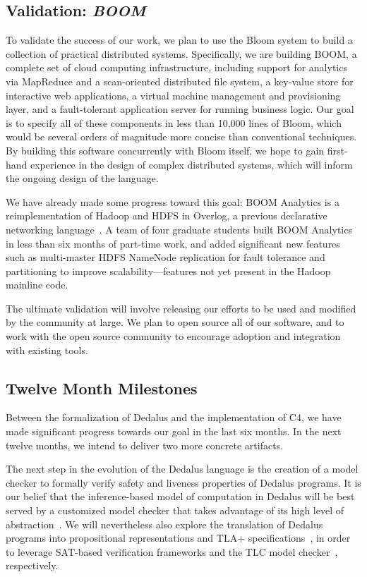 \subsection{Validation: \emph{BOOM}}
To validate the success of our work, we plan to use the Bloom system
to build a collection of practical distributed systems. Specifically,
we are building BOOM, a complete set of cloud computing
infrastructure, including support for analytics via MapReduce and a
scan-oriented distributed file system, a key-value store for
interactive web applications, a virtual machine management and
provisioning layer, and a fault-tolerant application server for
running business logic. Our goal is to specify all of these components
in less than 10,000 lines of Bloom, which would be several orders of
magnitude more concise than conventional techniques. By building this
software concurrently with Bloom itself, we hope to gain first-hand
experience in the design of complex distributed systems, which will
inform the ongoing design of the language.

We have already made some progress toward this goal: BOOM Analytics is
a reimplementation of Hadoop and HDFS in Overlog, a previous
declarative networking language~\cite{boom-eurosys}. A team of four
graduate students built BOOM Analytics in less than six months of
part-time work, and added significant new features such as
multi-master HDFS NameNode replication for fault tolerance and
partitioning to improve scalability---features not yet present in the
Hadoop mainline code.


The ultimate validation will involve releasing our efforts to be used
and modified by the community at large. We plan to open source all of
our software, and to work with the open source community to encourage
adoption and integration with existing tools.

\subsection{Twelve Month Milestones}

Between the formalization of Dedalus and the implementation of C4, we have made
significant progress towards our goal in the last six months.  In the next
twelve months, we intend to deliver two more concrete artifacts.

The next step in the evolution of the Dedalus language is the creation of a
model checker to formally verify safety and liveness properties of Dedalus
programs.  It is our belief that the inference-based model of computation in
Dedalus will be best served by a customized model checker that takes advantage
of its high level of abstraction~\cite{cardan, armc}.  We will nevertheless also
explore the translation of Dedalus programs into propositional representations
and TLA+ specifications~\cite{tla}, in order to leverage SAT-based verification
frameworks and the TLC model checker~\cite{tlc}, respectively.

